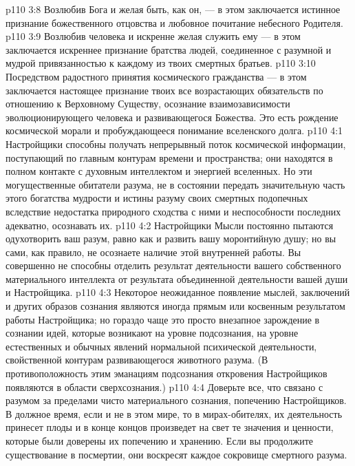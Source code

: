\vs p110 3:8 \bibnobreakspace Возлюбив Бога и желая быть, как он, --- в этом заключается истинное признание божественного отцовства и любовное почитание небесного Родителя.
\vs p110 3:9 \bibnobreakspace Возлюбив человека и искренне желая служить ему --- в этом заключается искреннее признание братства людей, соединенное с разумной и мудрой привязанностью к каждому из твоих смертных братьев.
\vs p110 3:10 \bibnobreakspace Посредством радостного принятия космического гражданства --- в этом заключается настоящее признание твоих все возрастающих обязательств по отношению к Верховному Существу, осознание взаимозависимости эволюционирующего человека и развивающегося Божества. Это есть рождение космической морали и пробуждающееся понимание вселенского долга.
\vs p110 4:1 Настройщики способны получать непрерывный поток космической информации, поступающий по главным контурам времени и пространства; они находятся в полном контакте с духовным интеллектом и энергией вселенных. Но эти могущественные обитатели разума, не в состоянии передать значительную часть этого богатства мудрости и истины разуму своих смертных подопечных вследствие недостатка природного сходства с ними и неспособности последних адекватно, осознавать их.
\vs p110 4:2 Настройщики Мысли постоянно пытаются одухотворить ваш разум, равно как и развить вашу моронтийную душу; но вы сами, как правило, не осознаете наличие этой внутренней работы. Вы совершенно не способны отделить результат деятельности вашего собственного материального интеллекта от результата объединенной деятельности вашей души и Настройщика.
\vs p110 4:3 Некоторое неожиданное появление мыслей, заключений и других образов сознания являются иногда прямым или косвенным результатом работы Настройщика; но гораздо чаще это просто внезапное зарождение в сознании идей, которые возникают на уровне подсознания, на уровне естественных и обычных явлений нормальной психической деятельности, свойственной контурам развивающегося животного разума. (В противоположность этим эманациям подсознания откровения Настройщиков появляются в области сверхсознания.)
\vs p110 4:4 Доверьте все, что связано с разумом за пределами чисто материального сознания, попечению Настройщиков. В должное время, если и не в этом мире, то в мирах\hyp{}обителях, их деятельность принесет плоды и в конце концов произведет на свет те значения и ценности, которые были доверены их попечению и хранению. Если вы продолжите существование в посмертии, они воскресят каждое сокровище смертного разума.

